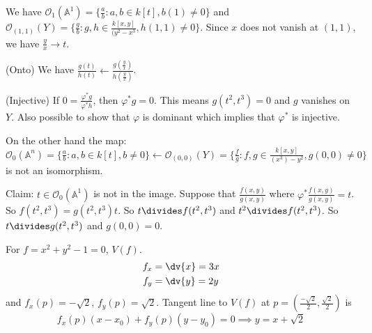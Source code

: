 \documentclass{report}
\begin{document}
\begin{examples}
    \begin{example}
            \begin{center}
            \end{center}
        We have $\mathcal{O}_{1}(\mathbb{A}^{1}) = \{\frac{a}{b} : a, b \in k[t], b(1) \neq 0\}$ and $\mathcal{O}_{(1, 1)}(Y) = \{\frac{g}{b} : g , h \in \frac{k[x, y]}{(y^{2} - x^{3}}, h(1, 1) \neq 0\}$. Since $x$ does not vanish at $(1, 1)$, we have $\frac{y}{x} \rightarrow t$.

        (Onto) We have $\frac{g(t)}{h(t)} \leftarrow \frac{g(\frac{y}{x})}{h(\frac{y}{x})}$.

        (Injective) If $0 = \frac{\varphi^{*}g}{\varphi^{*}h}$,  then $\varphi^{*}g= 0$. This means $g(t^{2}, t^{3}) = 0$ and $g$ vanishes on $Y$. Also possible to show that $\varphi$ is dominant which implies that $\varphi^{*}$ is injective. 

        On the other hand the map: $\mathcal{O}_{0}(\mathbb{A}^{n}) =  \{\frac{a}{b} : a, b \in k[t], b \neq 0\} \leftarrow \mathcal{O}_{(0, 0)}(Y) = \{\frac{f}{g} : f, g \in \frac{k[x, y]}{(x^{3}) - y^{2}}, g(0, 0) \neq 0\}$ is not an isomorphism.

        Claim: $t \in \mathcal{O}_{0}(\mathbb{A}^{1})$ is not in the image. Suppose that $\frac{f(x, y)}{g(x, y)}$ where $\varphi^{*}\frac{f(x, y)}{g(x, y)} = t$. So $f(t^{2}, t^{3}) = g(t^{2}, t^{3})t$. So $t \divides f(t^{2}, t^{3})$ and $t^{2} \divides f(t^{2}, t^{3})$. So $t \divides g(t^{2}, t^{3})$ and $g(0, 0) = 0$.
    \end{example}
    \begin{example}
        For $f = x^{2} + y^{2} - 1 = 0$, $V(f)$.
            \begin{align*}
                f_{x} &= \dv{x} = 3x \\
                f_{y} &= \dv{y} = 2y   
            \end{align*}
        and $f_{x}(p) = -\sqrt{2}$, $f_{y}(p) = \sqrt{2}$. Tangent line to $V(f)$ at $p = (\frac{-\sqrt{2}}{2}, \frac{\sqrt{2}}{2})$ is
            \begin{equation*}
                f_{x}(p) (x - x_{0}) + f_{y}(p)(y - y_{0}) = 0\implies  y = x + \sqrt{2}
            \end{equation*}
    \end{example}
\end{examples}
\end{document}
